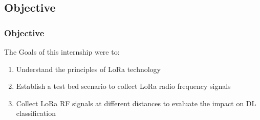 \subsection{Objective}
\begin{frame}
  \frametitle{Objective}
  
  The Goals of this internship were to:
  \begin{enumerate}
      \item Understand the principles of LoRa technology
      \item Establish a test bed scenario to collect LoRa radio frequency signals
      \item Collect LoRa RF signals at different distances to evaluate the impact on DL classification
  \end{enumerate}
  
\end{frame}


